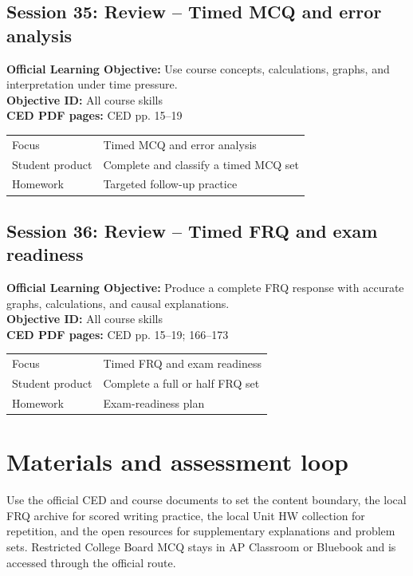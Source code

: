 \documentclass[11pt,a4paper]{article}
\newcommand{\objectivebox}[1]{\noindent\colorbox{aplight}{\parbox{0.96\textwidth}{#1}}}
\begin{document}
\subsection{Session 35: Review -- Timed MCQ and error analysis}
\objectivebox{\textbf{Official Learning Objective:} Use course concepts, calculations, graphs, and interpretation under time pressure.\\\textbf{Objective ID:} All course skills\\\textbf{CED PDF pages:} CED pp. 15–19}\par\vspace{0.4em}
\begin{tabularx}{\textwidth}{p{3.0cm}Y}
\toprule
Focus & Timed MCQ and error analysis\\
Student product & Complete and classify a timed MCQ set\\
Homework & Targeted follow-up practice\\
\bottomrule
\end{tabularx}
\subsection{Session 36: Review -- Timed FRQ and exam readiness}
\objectivebox{\textbf{Official Learning Objective:} Produce a complete FRQ response with accurate graphs, calculations, and causal explanations.\\\textbf{Objective ID:} All course skills\\\textbf{CED PDF pages:} CED pp. 15–19; 166–173}\par\vspace{0.4em}
\begin{tabularx}{\textwidth}{p{3.0cm}Y}
\toprule
Focus & Timed FRQ and exam readiness\\
Student product & Complete a full or half FRQ set\\
Homework & Exam-readiness plan\\
\bottomrule
\end{tabularx}
\section{Materials and assessment loop}
Use the official CED and course documents to set the content boundary, the local FRQ archive for scored writing practice, the local Unit HW collection for repetition, and the open resources for supplementary explanations and problem sets. Restricted College Board MCQ stays in AP Classroom or Bluebook and is accessed through the official route.
\end{document}
